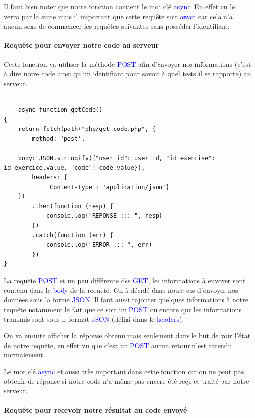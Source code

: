 \documentclass[a4paper]{article}
\renewcommand{\texttt}[2][blue]{\textcolor{#1}{\ttfamily #2}}
\begin{document}
Il faut bien noter que notre fonction contient le mot clé \texttt{async}. En
effet on le verra par la suite mais il important que cette requête soit
\texttt{await} car cela n'a aucun sens de commencer les requêtes suivantes sans
posséder l'identifiant.

\paragraph{Requête pour envoyer notre code au serveur}

Cette fonction va utiliser la méthode \texttt{POST} afin d'envoyer nos
informations (c'est à dire notre code ainsi qu'un identifiant pour savoir à
quel tests il se rapporte) au serveur.

\begin{lstlisting}[language=JS]

    async function getCode()
{
    return fetch(path+"php/get_code.php", {
        method: 'post',

	body: JSON.stringify({"user_id": user_id, "id_exercise": id_exercice.value, "code": code.value}),
        headers: {
            'Content-Type': 'application/json'}
    })
        .then(function (resp) {
            console.log("REPONSE ::: ", resp)
        })
        .catch(function (err) {
            console.log("ERROR ::: ", err)
        })
}
\end{lstlisting}

La requête \texttt{POST} et un peu différente des \texttt{GET}, les
informations à envoyer sont contenu dans le \texttt{body} de la requête. On à
décidé dans notre cas d'envoyer nos données sous la forme \texttt{JSON}. Il
faut aussi rajouter quelques informations à notre requête notamment le fait
que ce soit un \texttt{POST} ou encore que les informations transmis sont sous
le format \texttt{JSON} (défini dans le \texttt{headers}).

On va ensuite afficher la réponse obtenu mais seulement dans le but de voir
l'état de notre requête, en effet vu que c'est un \texttt{POST} aucun retour
n'est attendu normalement.

Le mot clé \texttt{async} et aussi très important dans cette fonction car on ne
peut pas obtenir de réponse si notre code n'a même pas encore été reçu et
traité par notre serveur.

\paragraph{Requête pour recevoir notre résultat au code envoyé}
\end{document}
